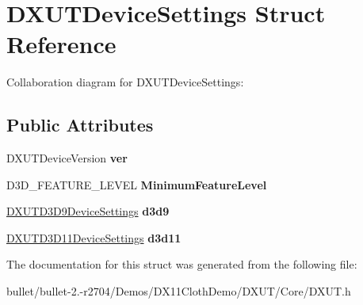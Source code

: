 \hypertarget{struct_d_x_u_t_device_settings}{\section{D\+X\+U\+T\+Device\+Settings Struct Reference}
\label{struct_d_x_u_t_device_settings}
}


Collaboration diagram for D\+X\+U\+T\+Device\+Settings\+:
\subsection*{Public Attributes}
\begin{DoxyCompactItemize}
\item 
\hypertarget{struct_d_x_u_t_device_settings_a88ee5e21eb857522f1c8beece1465407}{D\+X\+U\+T\+Device\+Version {\bfseries ver}}\label{struct_d_x_u_t_device_settings_a88ee5e21eb857522f1c8beece1465407}

\item 
\hypertarget{struct_d_x_u_t_device_settings_af7bc70a42e180595e1d789f5e7b91e2a}{D3\+D\+\_\+\+F\+E\+A\+T\+U\+R\+E\+\_\+\+L\+E\+V\+E\+L {\bfseries Minimum\+Feature\+Level}}\label{struct_d_x_u_t_device_settings_af7bc70a42e180595e1d789f5e7b91e2a}

\item 
\hypertarget{struct_d_x_u_t_device_settings_a82cb8dcae6ca92b5794757617b318923}{\hyperlink{struct_d_x_u_t_d3_d9_device_settings}{D\+X\+U\+T\+D3\+D9\+Device\+Settings} {\bfseries d3d9}}\label{struct_d_x_u_t_device_settings_a82cb8dcae6ca92b5794757617b318923}

\item 
\hypertarget{struct_d_x_u_t_device_settings_a41c03d2ab57c9dbb9882b67e8127c1d6}{\hyperlink{struct_d_x_u_t_d3_d11_device_settings}{D\+X\+U\+T\+D3\+D11\+Device\+Settings} {\bfseries d3d11}}\label{struct_d_x_u_t_device_settings_a41c03d2ab57c9dbb9882b67e8127c1d6}

\end{DoxyCompactItemize}


The documentation for this struct was generated from the following file\+:\begin{DoxyCompactItemize}
\item 
bullet/bullet-\/2.-\/r2704/\+Demos/\+D\+X11\+Cloth\+Demo/\+D\+X\+U\+T/\+Core/D\+X\+U\+T.\+h\end{DoxyCompactItemize}
